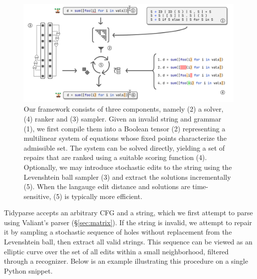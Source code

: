 \documentclass[sigplan,review,anonymous,acmsmall]{acmart}\settopmatter{printfolios=false,printccs=false,printacmref=false}
\begin{document}
\begin{figure}
  \centering
  \includegraphics[width=\linewidth]{../figures/architecture_overview.pdf}
  \caption{Our framework consists of three components, namely (2) a solver, (4) ranker and (3) sampler. Given an invalid string and grammar (1), we first compile them into a Boolean tensor (2) representing a multilinear system of equations whose fixed points characterize the admissible set. The system can be solved directly, yielding a set of repairs that are ranked using a suitable scoring function (4). Optionally, we may introduce stochastic edits to the string using the Levenshtein ball sampler (3) and extract the solutions incrementally (5). When the langauge edit distance and solutions are time-sensitive, (5) is typically more efficient.}
  \label{fig:overview}
\end{figure}

Tidyparse accepts an arbitrary CFG and a string, which we first attempt to parse using Valiant's parser (\S\ref{sec:matrix}). If the string is invalid, we attempt to repair it by sampling a stochastic sequence of holes without replacement from the Levenshtein ball, then extract all valid strings. This sequence can be viewed as an elliptic curve over the set of all edits within a small neighborhood, filtered through a recognizer. Below is an example illustrating this procedure on a single Python snippet.
\end{document}
